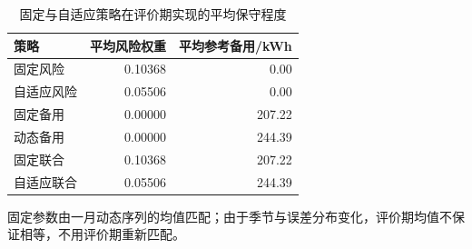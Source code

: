 \begin{table}[htbp]\centering\small
\caption{固定与自适应策略在评价期实现的平均保守程度}
\label{tab:v2_conservatism}
\begin{tabularx}{\linewidth}{LRR}\toprule
策略 & 平均风险权重 & 平均参考备用/kWh\\\midrule
固定风险 & 0.10368 & 0.00\\
自适应风险 & 0.05506 & 0.00\\
固定备用 & 0.00000 & 207.22\\
动态备用 & 0.00000 & 244.39\\
固定联合 & 0.10368 & 207.22\\
自适应联合 & 0.05506 & 244.39\\
\bottomrule\end{tabularx}
\par\smallskip\parbox{\linewidth}{\footnotesize 固定参数由一月动态序列的均值匹配；由于季节与误差分布变化，评价期均值不保证相等，不用评价期重新匹配。}
\end{table}
